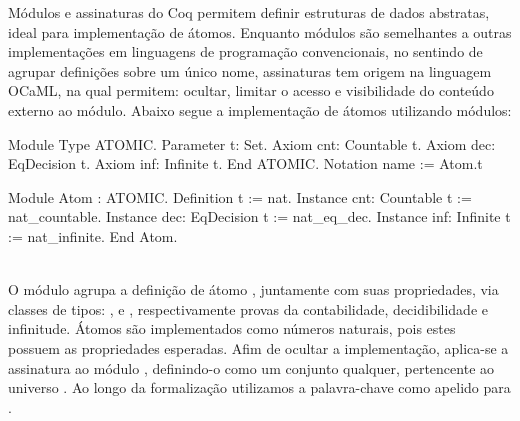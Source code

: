 Módulos e assinaturas do Coq permitem definir estruturas de dados abstratas, ideal para implementação de átomos. Enquanto módulos são semelhantes a outras implementações em linguagens de programação convencionais, no sentindo de agrupar definições sobre um único nome, assinaturas tem origem na linguagem OCaML, na qual permitem: ocultar, limitar o acesso e visibilidade do conteúdo externo ao módulo. Abaixo segue a implementação de átomos utilizando módulos:
\vspace*{.4em}\\
\begin{minipage}[t]{0.5\linewidth}
\begin{coqcode}
Module Type ATOMIC.
  Parameter t: Set.
  Axiom cnt: Countable t.
  Axiom dec: EqDecision t.
  Axiom inf: Infinite t.
End ATOMIC.
Notation name := Atom.t
\end{coqcode}
\end{minipage}
\hspace{-5em}
\begin{minipage}[t]{0.5\linewidth}
\begin{coqcode}
Module Atom : ATOMIC.
  Definition t := nat.
  Instance cnt: Countable t := nat_countable.
  Instance dec: EqDecision t := nat_eq_dec.
  Instance inf: Infinite t := nat_infinite.
End Atom.
\end{coqcode}
\end{minipage}
\vspace*{1em}\\
O módulo  agrupa a definição de átomo , juntamente com suas propriedades, via classes de tipos: ,  e , respectivamente provas da contabilidade, decidibilidade e infinitude. Átomos são implementados como números naturais, pois estes possuem as propriedades esperadas. Afim de ocultar a implementação, aplica-se a assinatura  ao módulo , definindo-o como um conjunto qualquer, pertencente ao universo . Ao longo da formalização utilizamos a palavra-chave  como apelido para . 

